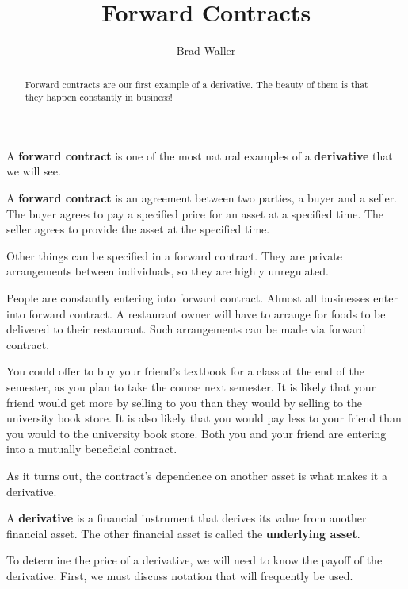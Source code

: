 \documentclass{ximera}
\author{Brad Waller}
\title{Forward Contracts}
\begin{document}
\begin{abstract}
Forward contracts are our first example of a derivative. The beauty of them is that they happen constantly in business!
\end{abstract}

\maketitle

A {\bf forward contract} is one of the most natural examples of a {\bf derivative} that we will see. 

\begin{definition}\label{def20}
A {\bf forward contract} is an agreement between two parties, a buyer and a seller. The buyer agrees to pay a specified price for an asset at a specified time. The seller agrees to provide the asset at the specified time.
\end{definition}

\begin{remark}
Other things can be specified in a forward contract. They are private arrangements between individuals, so they are highly unregulated. 
\end{remark}

People are constantly entering into forward contract. Almost all businesses enter into forward contract. A restaurant owner will have to arrange for foods to be delivered to their restaurant. Such arrangements can be made via forward contract. 

You could offer to buy your friend's textbook for a class at the end of the semester, as you plan to take the course next semester. It is likely that your friend would get more by selling to you than they would by selling to the university book store. It is also likely that you would pay less to your friend than you would to the university book store. Both you and your friend are entering into a mutually beneficial contract. 

As it turns out, the contract's dependence on another asset is what makes it a derivative.

\begin{definition}\label{def21}
A {\bf derivative} is a financial instrument that derives its value from another financial asset. The other financial asset is called the {\bf underlying asset}.
\end{definition}

To determine the price of a derivative, we will need to know the payoff of the derivative. First, we must discuss notation that will frequently be used. 
\end{document}
